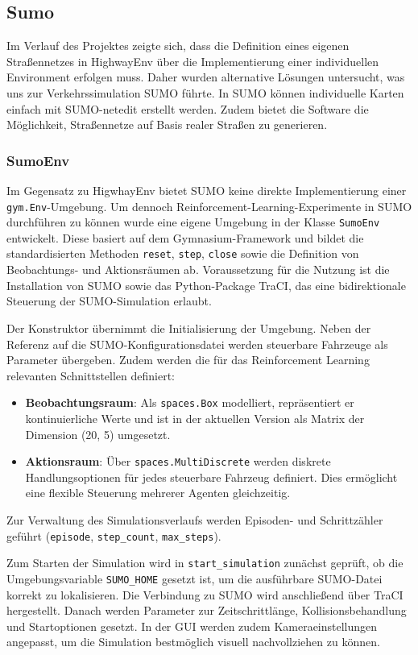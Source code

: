 \subsection{Sumo}
Im Verlauf des Projektes zeigte sich, dass die Definition eines eigenen Straßennetzes in HighwayEnv über die Implementierung einer individuellen Environment erfolgen muss. Daher wurden alternative Lösungen untersucht, was uns zur Verkehrssimulation SUMO führte. In SUMO können individuelle Karten einfach mit SUMO-netedit erstellt werden. Zudem bietet die Software die Möglichkeit, Straßennetze auf Basis realer Straßen zu generieren.
\subsubsection{SumoEnv}
Im Gegensatz zu HigwhayEnv bietet SUMO keine direkte Implementierung einer \texttt{gym.Env}-Umgebung. Um dennoch Reinforcement-Learning-Experimente in SUMO durchführen zu können wurde eine eigene Umgebung in der Klasse \texttt{SumoEnv} entwickelt. Diese basiert auf dem Gymnasium-Framework und bildet die standardisierten Methoden \texttt{reset}, \texttt{step}, \texttt{close} sowie die Definition von Beobachtungs- und Aktionsräumen ab. Voraussetzung für die Nutzung ist die Installation von SUMO sowie das Python-Package TraCI, das eine bidirektionale Steuerung der SUMO-Simulation erlaubt.

Der Konstruktor übernimmt die Initialisierung der Umgebung. Neben der Referenz auf die SUMO-Konfigurationsdatei werden steuerbare Fahrzeuge als Parameter übergeben. Zudem werden die für das Reinforcement Learning relevanten Schnittstellen definiert:
\begin{itemize}
    \item \textbf{Beobachtungsraum}: Als \texttt{spaces.Box} modelliert, repräsentiert er kontinuierliche Werte und ist in der aktuellen Version als Matrix der Dimension (20, 5) umgesetzt.
    \item \textbf{Aktionsraum}: Über \texttt{spaces.MultiDiscrete} werden diskrete Handlungsoptionen für jedes steuerbare Fahrzeug definiert. Dies ermöglicht eine flexible Steuerung mehrerer Agenten gleichzeitig.
\end{itemize}
Zur Verwaltung des Simulationsverlaufs werden Episoden- und Schrittzähler geführt (\texttt{episode}, \texttt{step\_count}, \texttt{max\_steps}).

Zum Starten der Simulation wird in \texttt{start\_simulation} zunächst geprüft, ob die Umgebungsvariable \texttt{SUMO\_HOME} gesetzt ist, um die ausführbare SUMO-Datei korrekt zu lokalisieren. Die Verbindung zu SUMO wird anschließend über TraCI hergestellt. Danach werden Parameter zur Zeitschrittlänge, Kollisionsbehandlung und Startoptionen gesetzt. In der GUI werden zudem Kameraeinstellungen angepasst, um die Simulation bestmöglich visuell nachvollziehen zu können.

